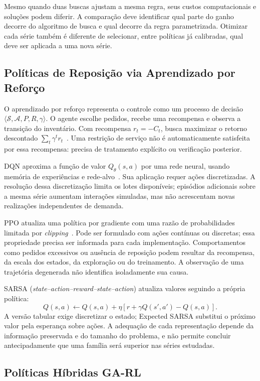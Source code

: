 Mesmo quando duas buscas ajustam a mesma regra, seus custos computacionais e soluções podem diferir. A comparação deve identificar qual parte do ganho decorre do algoritmo de busca e qual decorre da regra parametrizada. Otimizar cada série também é diferente de selecionar, entre políticas já calibradas, qual deve ser aplicada a uma nova série.

\subsection{Políticas de Reposição via Aprendizado por Reforço}

O aprendizado por reforço representa o controle como um processo de decisão $\langle\mathcal S,\mathcal A,P,R,\gamma\rangle$. O agente escolhe pedidos, recebe uma recompensa e observa a transição do inventário. Com recompensa $r_t=-C_t$, busca maximizar o retorno descontado $\sum_t\gamma^t r_t$~\citep{SuttonBarto2018RL}. Uma restrição de serviço não é automaticamente satisfeita por essa recompensa: precisa de tratamento explícito ou verificação posterior.

DQN aproxima a função de valor $Q_\theta(s,a)$ por uma rede neural, usando memória de experiências e rede-alvo~\citep{Mnih2015DQN}. Sua aplicação requer ações discretizadas. A resolução dessa discretização limita os lotes disponíveis; episódios adicionais sobre a mesma série aumentam interações simuladas, mas não acrescentam novas realizações independentes de demanda.

PPO atualiza uma política por gradiente com uma razão de probabilidades limitada por \textit{clipping}~\citep{Schulman2017PPO}. Pode ser formulado com ações contínuas ou discretas; essa propriedade precisa ser informada para cada implementação. Comportamentos como pedidos excessivos ou ausência de reposição podem resultar da recompensa, da escala dos estados, da exploração ou do treinamento. A observação de uma trajetória degenerada não identifica isoladamente sua causa.

SARSA (\textit{state--action--reward--state--action}) atualiza valores seguindo a própria política:
\[
Q(s,a)\leftarrow Q(s,a)+\eta[r+\gamma Q(s',a')-Q(s,a)].
\]
A versão tabular exige discretizar o estado; Expected SARSA substitui o próximo valor pela esperança sobre ações. A adequação de cada representação depende da informação preservada e do tamanho do problema, e não permite concluir antecipadamente que uma família será superior nas séries estudadas.

\subsection{Políticas Híbridas GA-RL}
\label{sec:ga_rl_arch}

